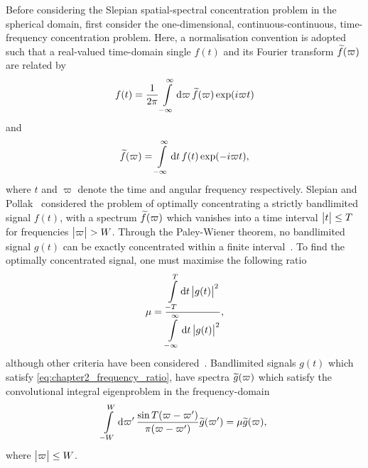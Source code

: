 Before considering the Slepian spatial-spectral concentration problem in the spherical domain, first consider the one-dimensional, continuous-continuous, time-frequency concentration problem.
Here, a normalisation convention is adopted such that a real-valued time-domain single \(f(t)\) and its Fourier transform \(\widetilde{f}(\varpi)\) are related by
%
\begin{equation}\label{eq:chapter2_fourier_time}
    f(t)
    = \frac{1}{2\pi} \int\limits_{-\infty}^{\infty} \dd{\varpi} \widetilde{f}(\varpi) \exp(i\varpi t)
\end{equation}
%
and
%
\begin{equation}\label{eq:chapter2_fourier_frequency}
    \widetilde{f}(\varpi)
    = \int\limits_{-\infty}^{\infty} \dd{t} f(t) \exp(-i\varpi t),
\end{equation}
%
where \(t\) and \(\varpi{}\) denote the time and angular frequency respectively.
Slepian and Pollak~\cite{Slepian1961} considered the problem of optimally concentrating a strictly bandlimited signal \(f(t)\), with a spectrum \(\widetilde{f}(\varpi)\) which vanishes into a time interval \(\big\lvert t\big\rvert \leq T\) for frequencies \(\big\lvert\varpi\big\rvert > W\).
Through the Paley-Wiener theorem, no bandlimited signal \(g(t)\) can be exactly concentrated within a finite interval~\cite{Daubechies1992,Mallat2008}.
To find the optimally concentrated signal, one must maximise the following ratio
%
\begin{equation}\label{eq:chapter2_frequency_ratio}
    \mu
    = \frac{\displaystyle\int\limits_{-T}^{T} \dd{t} \big\lvert g(t)\big\rvert^{2}}
    {\displaystyle\int\limits_{-\infty}^{\infty} \dd{t} \big\lvert g(t)\big\rvert^{2}},
\end{equation}
%
although other criteria have been considered~\cite{Freeden1997,Riedel1995}.
Bandlimited signals \(g(t)\) which satisfy \cref{eq:chapter2_frequency_ratio}, have spectra \(\widetilde{g}(\varpi)\) which satisfy the convolutional integral eigenproblem in the frequency-domain
%
\begin{equation}\label{eq:chapter2_frequency_eigenproblem}
    \int\limits_{-W}^{W} \dd{\varpi'} \frac{\sin{T(\varpi-\varpi')}}{\pi(\varpi-\varpi')} \widetilde{g}(\varpi')
    = \mu \widetilde{g}(\varpi),
\end{equation}
%
where \(\big\lvert\varpi\big\rvert \leq W\).

